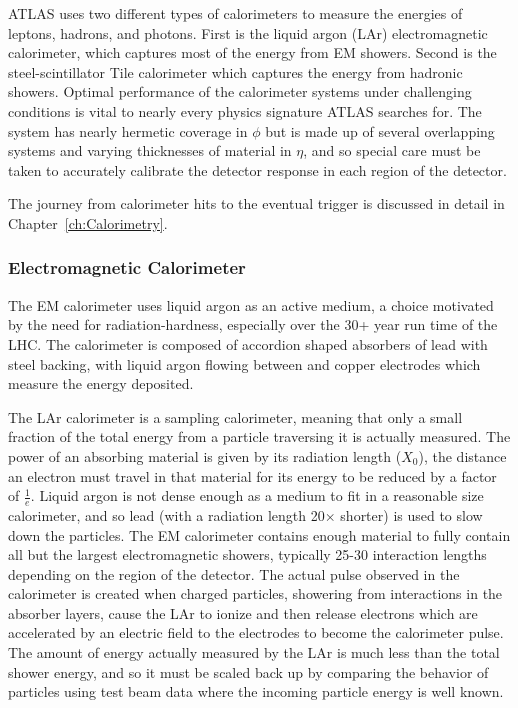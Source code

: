 ATLAS uses two different types of calorimeters to measure the energies of leptons, hadrons, and photons.  First is the liquid argon (LAr) electromagnetic calorimeter, which captures most of the energy from EM showers.  Second is the steel-scintillator Tile calorimeter which captures the energy from hadronic showers.  Optimal performance of the calorimeter systems under challenging conditions is vital to nearly every physics signature ATLAS searches for.  The system has nearly hermetic coverage in $\phi$ but is made up of several overlapping systems and varying thicknesses of material in $\eta$, and so special care must be taken to accurately calibrate the detector response in each region of the detector.

The journey from calorimeter hits to the eventual trigger is discussed in detail in Chapter~\ref{ch:Calorimetry}.

\subsubsection{Electromagnetic Calorimeter}

The EM calorimeter uses liquid argon as an active medium, a choice motivated by the need for radiation-hardness, especially over the 30+ year run time of the LHC.  The calorimeter is composed of accordion shaped absorbers of lead with steel backing, with liquid argon flowing between and copper electrodes which measure the energy deposited.

The LAr calorimeter is a sampling calorimeter, meaning that only a small fraction of the total energy from a particle traversing it is actually measured.  The power of an absorbing material is given by its radiation length ($X_0$), the distance an electron must travel in that material for its energy to be reduced by a factor of $\frac{1}{e}$.  Liquid argon is not dense enough as a medium to fit in a reasonable size calorimeter, and so lead (with a radiation length 20$\times$ shorter) is used to slow down the particles.  The EM calorimeter contains enough material to fully contain all but the largest electromagnetic showers, typically 25-30 interaction lengths depending on the region of the detector.  The actual pulse observed in the calorimeter is created when charged particles, showering from interactions in the absorber layers, cause the LAr to ionize and then release electrons which are accelerated by an electric field to the electrodes to become the calorimeter pulse.  The amount of energy actually measured by the LAr is much less than the total shower energy, and so it must be scaled back up by comparing the behavior of particles using test beam data where the incoming particle energy is well known.

